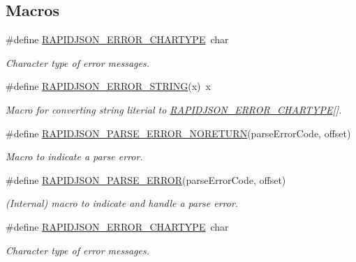 \subsection*{Macros}
\begin{DoxyCompactItemize}
\item 
\#define \hyperlink{group__RAPIDJSON__ERRORS_ga7e4636fd48d0148f102b8a13f0539d8c}{R\+A\+P\+I\+D\+J\+S\+O\+N\+\_\+\+E\+R\+R\+O\+R\+\_\+\+C\+H\+A\+R\+T\+Y\+PE}~char
\begin{DoxyCompactList}\small\item\em Character type of error messages. \end{DoxyCompactList}\item 
\#define \hyperlink{group__RAPIDJSON__ERRORS_gabe2e1bd1349e5a7d6c1af78c05a98f0d}{R\+A\+P\+I\+D\+J\+S\+O\+N\+\_\+\+E\+R\+R\+O\+R\+\_\+\+S\+T\+R\+I\+NG}(x)~x
\begin{DoxyCompactList}\small\item\em Macro for converting string literial to \hyperlink{group__RAPIDJSON__ERRORS_ga7e4636fd48d0148f102b8a13f0539d8c}{R\+A\+P\+I\+D\+J\+S\+O\+N\+\_\+\+E\+R\+R\+O\+R\+\_\+\+C\+H\+A\+R\+T\+Y\+PE}\mbox{[}\mbox{]}. \end{DoxyCompactList}\item 
\#define \hyperlink{group__RAPIDJSON__ERRORS_ga7f8c4265b2edda78568ae3338aaf1461}{R\+A\+P\+I\+D\+J\+S\+O\+N\+\_\+\+P\+A\+R\+S\+E\+\_\+\+E\+R\+R\+O\+R\+\_\+\+N\+O\+R\+E\+T\+U\+RN}(parse\+Error\+Code,  offset)
\begin{DoxyCompactList}\small\item\em Macro to indicate a parse error. \end{DoxyCompactList}\item 
\#define \hyperlink{group__RAPIDJSON__ERRORS_gae3689840fa6e89a241313f33b602f865}{R\+A\+P\+I\+D\+J\+S\+O\+N\+\_\+\+P\+A\+R\+S\+E\+\_\+\+E\+R\+R\+OR}(parse\+Error\+Code,  offset)
\begin{DoxyCompactList}\small\item\em (Internal) macro to indicate and handle a parse error. \end{DoxyCompactList}\item 
\#define \hyperlink{group__RAPIDJSON__ERRORS_ga7e4636fd48d0148f102b8a13f0539d8c}{R\+A\+P\+I\+D\+J\+S\+O\+N\+\_\+\+E\+R\+R\+O\+R\+\_\+\+C\+H\+A\+R\+T\+Y\+PE}~char
\begin{DoxyCompactList}\small\item\em Character type of error messages. \end{DoxyCompactList}\item 

\end{DoxyCompactItemize}
